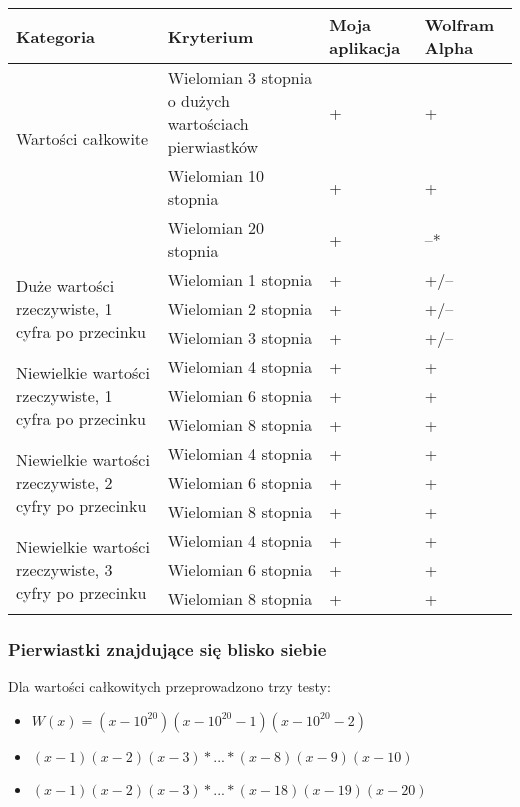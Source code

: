 \documentclass[oneside,a4paper]{book}
\begin{document}
	\begin{center}
		\begin{tabular}{ |p{5cm}|p{5cm}|p{1.5cm}|p{1.5cm}| } 
			\hline
			Kategoria & Kryterium & Moja aplikacja & Wolfram Alpha \\
			\hline
			\multirow{2}{*}{Wartości całkowite}
			& Wielomian 3 stopnia o dużych wartościach pierwiastków & + & + \\
			& Wielomian 10 stopnia & + & + \\
			& Wielomian 20 stopnia & + & --* \\
			\hline
			\multirow{3}{12em}{Duże wartości rzeczywiste, 1 cyfra po przecinku}
			& Wielomian 1 stopnia & + & +/-- \\
			& Wielomian 2 stopnia & + & +/-- \\
			& Wielomian 3 stopnia & + & +/-- \\
			\hline
			\multirow{3}{14em}{Niewielkie wartości rzeczywiste, 1 cyfra po przecinku}
			& Wielomian 4 stopnia & + & + \\
			& Wielomian 6 stopnia & + & + \\
			& Wielomian 8 stopnia & + & + \\
			\hline
			\multirow{3}{14em}{Niewielkie wartości rzeczywiste, 2 cyfry po przecinku}
			& Wielomian 4 stopnia & + & + \\
			& Wielomian 6 stopnia & + & + \\
			& Wielomian 8 stopnia & + & + \\
			\hline
			\multirow{3}{14em}{Niewielkie wartości rzeczywiste, 3 cyfry po przecinku}
			& Wielomian 4 stopnia & + & + \\
			& Wielomian 6 stopnia & + & + \\
			& Wielomian 8 stopnia & + & + \\
			\hline
		\end{tabular}
	\end{center}
	
	\subsubsection {Pierwiastki znajdujące się blisko siebie}
	
	Dla wartości całkowitych przeprowadzono trzy testy:
	\begin{itemize}
		\item $W(x)=(x-10^{20})(x-10^{20}-1)(x-10^{20}-2)$
		\item $(x-1)(x-2)(x-3)*...*(x-8)(x-9)(x-10)$
		\item $(x-1)(x-2)(x-3)*...*(x-18)(x-19)(x-20)$
	\end{itemize}
	
\end{document}
